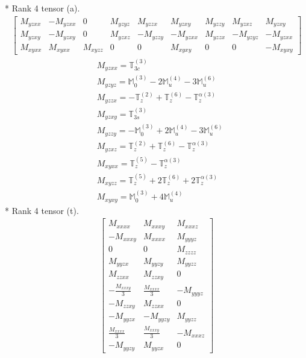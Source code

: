 \documentclass[fleqn,8pt,landscape]{jsarticle}
\begin{document}
* Rank 4 tensor (a).
\begin{align*}
\begin{bmatrix} M_{yzxx} & - M_{yzxx} & 0 & M_{yzyz} & M_{yzzx} & M_{yzxy} & M_{yzzy} & M_{yzxz} & M_{yzxy} \\ M_{yzxy} & - M_{yzxy} & 0 & M_{yzxz} & - M_{yzzy} & - M_{yzxx} & M_{yzzx} & - M_{yzyz} & - M_{yzxx} \\ M_{xyxx} & M_{xyxx} & M_{xyzz} & 0 & 0 & M_{xyxy} & 0 & 0 & - M_{xyxy} \end{bmatrix}
\end{align*}
\begin{align*}
& M_{yzxx} = \mathbb{T}_{3c}^{(3)} \\
& M_{yzyz} = \mathbb{M}_{0}^{(3)} - 2 \mathbb{M}_{u}^{(4)} - 3 \mathbb{M}_{u}^{(6)} \\
& M_{yzzx} = - \mathbb{T}_{z}^{(2)} + \mathbb{T}_{z}^{(6)} - \mathbb{T}_{z}^{\alpha(3)} \\
& M_{yzxy} = \mathbb{T}_{3s}^{(3)} \\
& M_{yzzy} = - \mathbb{M}_{0}^{(3)} + 2 \mathbb{M}_{u}^{(4)} - 3 \mathbb{M}_{u}^{(6)} \\
& M_{yzxz} = \mathbb{T}_{z}^{(2)} + \mathbb{T}_{z}^{(6)} - \mathbb{T}_{z}^{\alpha(3)} \\
& M_{xyxx} = \mathbb{T}_{z}^{(5)} - \mathbb{T}_{z}^{\alpha(3)} \\
& M_{xyzz} = \mathbb{T}_{z}^{(5)} + 2 \mathbb{T}_{z}^{(6)} + 2 \mathbb{T}_{z}^{\alpha(3)} \\
& M_{xyxy} = \mathbb{M}_{0}^{(3)} + 4 \mathbb{M}_{u}^{(4)}
\end{align*}
* Rank 4 tensor (t).
\begin{align*}
\begin{bmatrix} M_{xxxx} & M_{xxxy} & M_{xxxz} \\ - M_{xxxy} & M_{xxxx} & M_{yyyz} \\ 0 & 0 & M_{zzzz} \\ M_{yyzx} & M_{yyzy} & M_{yyzz} \\ M_{zzxx} & M_{zzxy} & 0 \\ - \frac{M_{xxxy}}{3} & \frac{M_{xxxx}}{3} & - M_{yyyz} \\ - M_{zzxy} & M_{zzxx} & 0 \\ - M_{yyzx} & - M_{yyzy} & M_{yyzz} \\ \frac{M_{xxxx}}{3} & \frac{M_{xxxy}}{3} & - M_{xxxz} \\ - M_{yyzy} & M_{yyzx} & 0 \end{bmatrix}
\end{align*}
\end{document}
